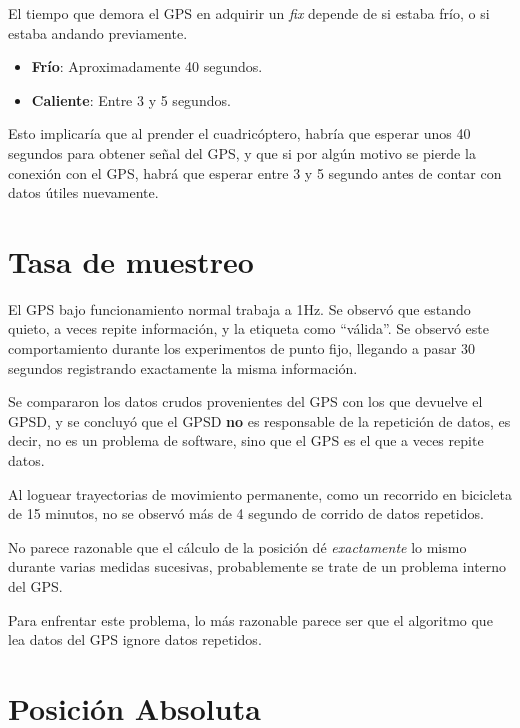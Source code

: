 \documentclass[main]{subfiles}
\begin{document}
El tiempo que demora el GPS en adquirir un \textit{fix} depende de si estaba frío, o si estaba andando previamente.
\begin{itemize}
\item \textbf{Frío}: Aproximadamente 40 segundos.
\item \textbf{Caliente}: Entre 3 y 5 segundos.
\end{itemize}

Esto implicaría que al prender el cuadricóptero, habría que esperar unos 40 segundos para obtener señal del GPS, y que si por algún motivo se pierde la conexión con el GPS, habrá que esperar entre 3 y 5 segundo antes de contar con datos útiles nuevamente.

\section{Tasa de muestreo}
\label{sec:tasa-de-muestreo}

El GPS bajo funcionamiento normal trabaja a 1Hz. Se observó que estando quieto, a veces repite información, y la etiqueta como ``válida''. Se observó este comportamiento durante los experimentos de punto fijo, llegando a pasar 30 segundos registrando exactamente la misma información.

Se compararon los datos crudos provenientes del GPS con los que devuelve el GPSD, y se concluyó que el GPSD \textbf{no} es responsable de la repetición de datos, es decir, no es un problema de software, sino que el GPS es el que a veces repite datos.

Al loguear trayectorias de movimiento permanente, como un recorrido en bicicleta de 15 minutos, no se observó más de 4 segundo de corrido de datos repetidos.

No parece razonable que el cálculo de la posición dé \textit{exactamente} lo mismo durante varias medidas sucesivas, probablemente se trate de un problema interno del GPS.

Para enfrentar este problema, lo más razonable parece ser que el algoritmo que lea datos del GPS ignore datos repetidos.

\section{Posición Absoluta}
\label{sec:posicion-absoluta}
\end{document}
